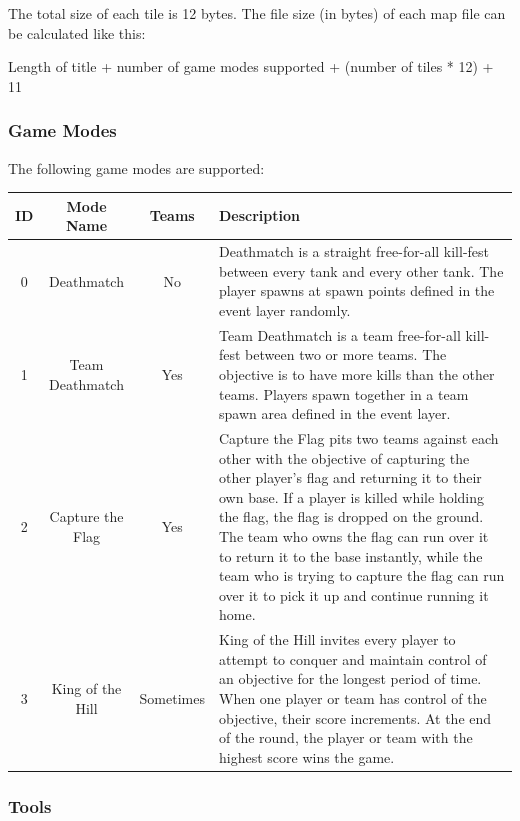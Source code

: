 The total size of each tile is 12 bytes. The file size (in bytes) of each map file can be calculated like this:

\begin{commands}
Length of title + number of game modes supported + (number of tiles * 12) + 11
\end{commands}

\subsubsection{Game Modes}

The following game modes are supported:
\begin{center}
\centering
\begin{tabular}{ | c | c | c | p{8cm} |}
\hline
ID 	& Mode Name					& Teams 		& Description \\	[1.0ex]
\hline\hline
0 	& Deathmatch 				& No 				& Deathmatch is a straight free-for-all kill-fest between every tank and every other tank. The player spawns at spawn points defined in the event layer randomly. \\	[1.0ex]
1 	&	Team Deathmatch 	& Yes				& Team Deathmatch is a team free-for-all kill-fest between two or more teams. The objective is to have more kills than the other teams. Players spawn together in a team spawn area defined in the event layer. \\	[1.0ex]
2 	& Capture the Flag  & Yes				& Capture the Flag pits two teams against each other with the objective of capturing the other player's flag and returning it to their own base. If a player is killed while holding the flag, the flag is dropped on the ground.  The team who owns the flag can run over it to return it to the base instantly, while the team who is trying to capture the flag can run over it to pick it up and continue running it home. \\	[1.0ex]
3		& King of the Hill	& Sometimes	& King of the Hill invites every player to attempt to conquer and maintain control of an objective  for the longest period of time. When one player or team has control of the  objective, their score increments. At the end of the round, the player or team with the highest score wins the game. \\  [1.0ex]
\hline\hline
\end{tabular}
\label{table:nonlin}
\end{center}

\newpage

\subsubsection{Tools}

